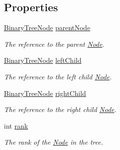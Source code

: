\subsection*{Properties}
\begin{DoxyCompactItemize}
\item 
\hyperlink{class_binary_tree_amortized_analyis_1_1_binary_tree_node}{Binary\+Tree\+Node} \hyperlink{class_binary_tree_amortized_analyis_1_1_binary_tree_node_a66851e31edeac9c93a6b0cc69ac1f96c}{parent\+Node}
\begin{DoxyCompactList}\small\item\em The reference to the parent \hyperlink{class_binary_tree_amortized_analyis_1_1_node}{Node}. \end{DoxyCompactList}\item 
\hyperlink{class_binary_tree_amortized_analyis_1_1_binary_tree_node}{Binary\+Tree\+Node} \hyperlink{class_binary_tree_amortized_analyis_1_1_binary_tree_node_a89e7a56fcfbe07917a210cec6a6b3e19}{left\+Child}
\begin{DoxyCompactList}\small\item\em The reference to the left child \hyperlink{class_binary_tree_amortized_analyis_1_1_node}{Node}. \end{DoxyCompactList}\item 
\hyperlink{class_binary_tree_amortized_analyis_1_1_binary_tree_node}{Binary\+Tree\+Node} \hyperlink{class_binary_tree_amortized_analyis_1_1_binary_tree_node_afcc481e3838ebd3f2f582dd07a646b05}{right\+Child}
\begin{DoxyCompactList}\small\item\em The reference to the right child \hyperlink{class_binary_tree_amortized_analyis_1_1_node}{Node}. \end{DoxyCompactList}\item 
int \hyperlink{class_binary_tree_amortized_analyis_1_1_binary_tree_node_a496b6f02ef6ec89dfa84f95da62efef3}{rank}
\begin{DoxyCompactList}\small\item\em The rank of the \hyperlink{class_binary_tree_amortized_analyis_1_1_node}{Node} in the tree. \end{DoxyCompactList}\end{DoxyCompactItemize}


